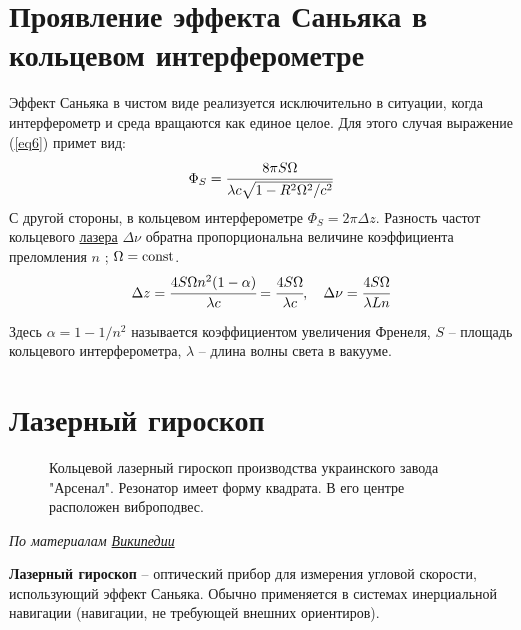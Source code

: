 \documentclass[a4paper, 12pt, openany]{book}
\begin{document}
	\section{Проявление эффекта Саньяка в кольцевом интерферометре}
	Эффект Саньяка в чистом виде реализуется исключительно в ситуации, когда интерферометр и среда вращаются как единое целое. Для этого случая выражение (\ref{eq6}) примет вид:
	\begin{equation}
	\label{eq7}
	\Phi_S = \cfrac{8 \pi S \Omega}{\lambda c \sqrt{1 - R^2 \Omega^2 / c^2}}
	\end{equation}
	С другой стороны, в кольцевом интерферометре $\Phi_S = 2 \pi \Delta z$. Разность частот кольцевого \underline{лазера} $\Delta \nu$ обратна пропорциональна величине коэффициента преломления $n$ \cite{litlink5}; $\Omega = \operatorname{\mathop{const}}$.
	\begin{equation}
	\label{eq8}
	\Delta z = \cfrac{4 S \Omega n^2 (1- \alpha)}{\lambda c} = \cfrac{4 S \Omega}{\lambda c}, \ \ \  \Delta \nu = \cfrac{4 S \Omega}{\lambda L n}
	\end{equation}
	
	Здесь $\alpha = 1 - 1/n^2$ называется коэффициентом увеличения Френеля, $S$ -- площадь кольцевого интерферометра, $\lambda$ -- длина волны света в вакууме.
	
	\section{Лазерный гироскоп}
	\begin{wrapfigure}{r}{0.5\linewidth}
		\caption{
			Кольцевой лазерный гироскоп производства украинского завода "Арсенал". Резонатор имеет форму квадрата. В его центре расположен виброподвес.
		}
		\label{pic2}
		\vspace{-30pt}
	\end{wrapfigure}
	\textit{ По материалам \href{https://ru.wikipedia.org/wiki/\%D0\%9B\%D0\%B0\%D0\%B7\%D0\%B5\%D1\%80\%D0\%BD\%D1\%8B\%D0\%B9\_\%D0\%B3\%D0\%B8\%D1\%80\%D0\%BE\%D1\%81\%D0\%BA\%D0\%BE\%D0\%BF}{Википедии}}
	
	\textbf{Лазерный гироскоп} -- оптический прибор для измерения угловой скорости, использующий эффект Саньяка. Обычно применяется в системах инерциальной навигации (навигации, не требующей внешних ориентиров).
	
\end{document}
